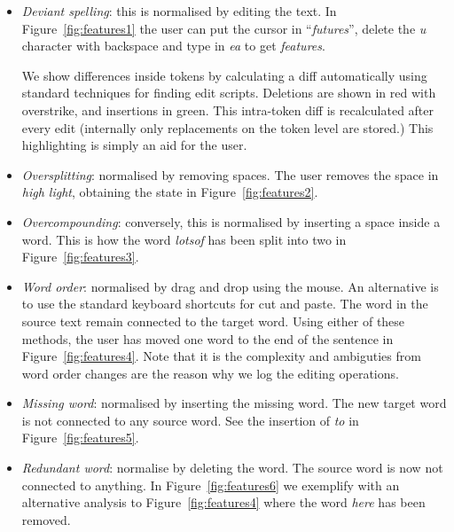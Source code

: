 \documentclass[10pt, a4paper]{article}
\begin{document}
\begin{itemize}
\item {\it Deviant spelling}: this is normalised by editing the text.
In Figure~\ref{fig:features1} the user can put the cursor in ``\emph{futures}'',
delete the \emph{u} character with backspace and type in \emph{ea} to get \emph{features}.

We show differences inside tokens by calculating a diff automatically using
standard techniques for finding edit scripts.  Deletions are shown in red
with overstrike, and insertions in green.  This intra-token diff
is recalculated after every edit (internally only replacements on the
token level are stored.)  This highlighting is simply an aid for the user.

\item {\it Oversplitting}: normalised by removing spaces.
The user removes the space in \emph{high light}, obtaining the state in Figure~\ref{fig:features2}.

\item {\it Overcompounding}: conversely, this is normalised by inserting a space inside a word.
This is how the word \emph{lotsof} has been split into two in Figure~\ref{fig:features3}.

\item {\it Word order}: normalised by drag and drop using the mouse.
An alternative is to use the standard keyboard shortcuts for cut and paste.
The word in the source text remain connected to the target word.
Using either of these methods, the user has moved one word to the end of the
sentence in Figure~\ref{fig:features4}. Note that it is the complexity and ambiguties from word order changes
are the reason why we log the editing operations.


\item {\it Missing word}: normalised by inserting the missing word.
The new target word is not connected to any source word.
See the insertion of \emph{to} in Figure~\ref{fig:features5}.

\item {\it Redundant word}: normalise by deleting the word.
The source word is now not connected to anything.
In Figure~\ref{fig:features6} we exemplify with
an alternative analysis to Figure~\ref{fig:features4} where the word \emph{here} has been removed.

\end{itemize}
\end{document}
